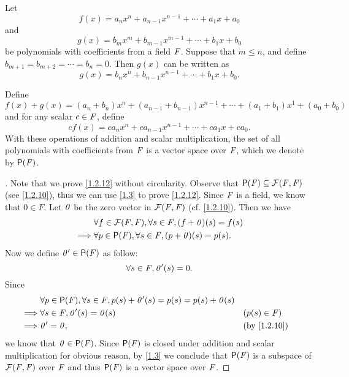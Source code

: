 \begin{eg}\label{1.2.12}
  Let
  \[
    f(x) = a_n x^n + a_{n - 1} x^{n - 1} + \cdots + a_1 x + a_0
  \]
  and
  \[
    g(x) = b_m x^m + b_{m - 1} x^{m - 1} + \cdots + b_1 x + b_0
  \]
  be polynomials with coefficients from a field \(\mathit{F}\).
  Suppose that \(m \leq n\), and define \(b_{m + 1} = b_{m + 2} = \cdots = b_n = 0\).
  Then \(g(x)\) can be written as
  \[
    g(x) = b_n x^n + b_{n - 1} x^{n - 1} + \cdots + b_1 x + b_0.
  \]

  Define
  \[
    f(x) + g(x) = (a_n + b_n) x^n + (a_{n - 1} + b_{n - 1}) x^{n - 1} + \cdots + (a_1 + b_1) x^1 + (a_0 + b_0)
  \]
  and for any scalar \(c \in \mathit{F}\), define
  \[
    cf(x) = ca_n x^n + ca_{n - 1} x^{n - 1} + \cdots + ca_1 x + ca_0.
  \]
  With these operations of addition and scalar multiplication, the set of all polynomials with coefficients from \(\mathit{F}\) is a vector space over \(\mathit{F}\), which we denote by \(\ps{\F}\).
\end{eg}

\begin{proof}[]
  Note that we prove \cref{1.2.12} without circularity.
  Observe that \(\ps{\F} \subseteq \fs(\F, \F)\) (see \cref{1.2.10}), thus we can use \cref{1.3} to prove \cref{1.2.12}.
  Since \(\mathit{F}\) is a field, we know that \(0 \in F\).
  Let \(\mathit{0}\) be the zero vector in \(\mathcal{F}(\mathit{F}, \mathit{F})\) (cf. \cref{1.2.10}).
  Then we have
  \begin{align*}
             & \forall f \in \fs(\F, \F), \forall s \in \F, (f + \zv)(s) = f(s) \\
    \implies & \forall p \in \ps{\F}, \forall s \in \F, (p + \zv)(s) = p(s).
  \end{align*}
  Now we define \(\zv' \in \ps{F}\) as follow:
  \[
    \forall s \in \mathit{F}, \mathit{0}'(s) = 0.
  \]
  Since
  \begin{align*}
             & \forall p \in \ps{\F}, \forall s \in \F, p(s) + \zv'(s) = p(s) = p(s) + \zv(s)                    \\
    \implies & \forall s \in \F, \zv'(s) = \zv(s)                                             &  & (p(s) \in \F) \\
    \implies & \zv' = \zv,                                                                    &  & \by{1.2.10}
  \end{align*}
  we know that \(\zv \in \ps{\F}\).
  Since \(\ps{\F}\) is closed under addition and scalar multiplication for obvious reason, by \cref{1.3} we conclude that \(\ps{\F}\) is a subspace of \(\mathcal{F}(\mathit{F}, \mathit{F})\) over \(\mathit{F}\) and thus \(\ps{\F}\) is a vector space over \(\mathit{F}\).
\end{proof}

